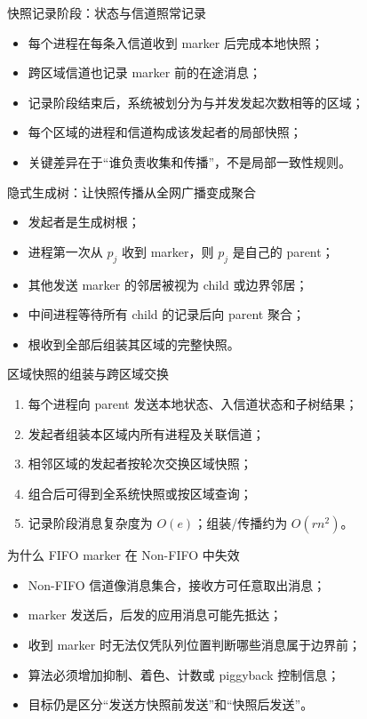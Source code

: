 \documentclass[UTF8,fontset=none,aspectratio=169,10pt]{beamer}
\begin{document}
\begin{frame}{快照记录阶段：状态与信道照常记录}
\begin{itemize}
  \item 每个进程在每条入信道收到 marker 后完成本地快照；
  \item 跨区域信道也记录 marker 前的在途消息；
  \item 记录阶段结束后，系统被划分为与并发发起次数相等的区域；
  \item 每个区域的进程和信道构成该发起者的局部快照；
  \item 关键差异在于“谁负责收集和传播”，不是局部一致性规则。
\end{itemize}
\end{frame}

\begin{frame}{隐式生成树：让快照传播从全网广播变成聚合}
\begin{itemize}
  \item 发起者是生成树根；
  \item 进程第一次从 $p_j$ 收到 marker，则 $p_j$ 是自己的 parent；
  \item 其他发送 marker 的邻居被视为 child 或边界邻居；
  \item 中间进程等待所有 child 的记录后向 parent 聚合；
  \item 根收到全部后组装其区域的完整快照。
\end{itemize}
\end{frame}

\begin{frame}{区域快照的组装与跨区域交换}
\begin{enumerate}
  \item 每个进程向 parent 发送本地状态、入信道状态和子树结果；
  \item 发起者组装本区域内所有进程及关联信道；
  \item 相邻区域的发起者按轮次交换区域快照；
  \item 组合后可得到全系统快照或按区域查询；
  \item 记录阶段消息复杂度为 $O(e)$；组装/传播约为 $O(rn^2)$。
\end{enumerate}
\vfill
{}
\end{frame}


\begin{frame}{为什么 FIFO marker 在 Non-FIFO 中失效}
\begin{itemize}
  \item Non-FIFO 信道像消息集合，接收方可任意取出消息；
  \item marker 发送后，后发的应用消息可能先抵达；
  \item 收到 marker 时无法仅凭队列位置判断哪些消息属于边界前；
  \item 算法必须增加抑制、着色、计数或 piggyback 控制信息；
  \item 目标仍是区分“发送方快照前发送”和“快照后发送”。
\end{itemize}
\end{frame}
\end{document}
